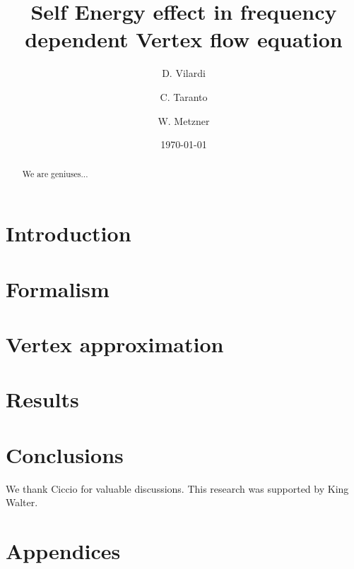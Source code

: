 \documentclass[aps,prb,twocolumn,showpacs,superscriptaddress,groupedaddress]{revtex4}
\begin{document}
\title{Self Energy effect in frequency dependent Vertex flow equation}

\author {D. Vilardi}
\author{C. Taranto}
\author{W. Metzner}

\date{\today}

\begin{abstract}
We are geniuses...
\end{abstract}

\pacs{}
\maketitle

\section{Introduction}
\label{sec:introduction}


\section{Formalism}
\label{sec:formalism}


\section{Vertex approximation}
\label{sec:vertex}


\section{Results}
\label{sec:results}


\section{Conclusions}
\label{sec:conclusions}


\begin{acknowledgments}
We thank Ciccio for valuable discussions. This research was supported by King Walter.
\end{acknowledgments}

\section{Appendices}
\label{sec:appendices}


%  
\end{document}
